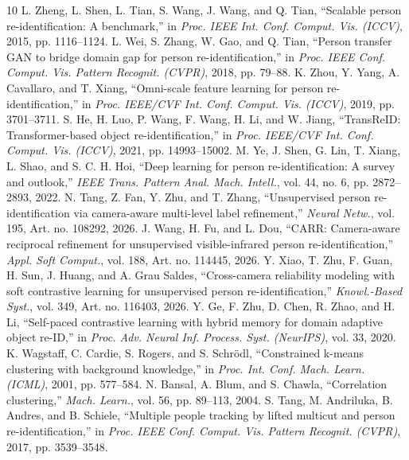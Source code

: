 \documentclass[journal]{IEEEtran}
\begin{document}
\begin{thebibliography}{10}
 L. Zheng, L. Shen, L. Tian, S. Wang, J. Wang, and Q. Tian, ``Scalable person re-identification: A benchmark,'' in \emph{Proc. IEEE Int. Conf. Comput. Vis. (ICCV)}, 2015, pp. 1116--1124.
 L. Wei, S. Zhang, W. Gao, and Q. Tian, ``Person transfer GAN to bridge domain gap for person re-identification,'' in \emph{Proc. IEEE Conf. Comput. Vis. Pattern Recognit. (CVPR)}, 2018, pp. 79--88.
 K. Zhou, Y. Yang, A. Cavallaro, and T. Xiang, ``Omni-scale feature learning for person re-identification,'' in \emph{Proc. IEEE/CVF Int. Conf. Comput. Vis. (ICCV)}, 2019, pp. 3701--3711.
 S. He, H. Luo, P. Wang, F. Wang, H. Li, and W. Jiang, ``TransReID: Transformer-based object re-identification,'' in \emph{Proc. IEEE/CVF Int. Conf. Comput. Vis. (ICCV)}, 2021, pp. 14993--15002.
 M. Ye, J. Shen, G. Lin, T. Xiang, L. Shao, and S. C. H. Hoi, ``Deep learning for person re-identification: A survey and outlook,'' \emph{IEEE Trans. Pattern Anal. Mach. Intell.}, vol. 44, no. 6, pp. 2872--2893, 2022.
 N. Tang, Z. Fan, Y. Zhu, and T. Zhang, ``Unsupervised person re-identification via camera-aware multi-level label refinement,'' \emph{Neural Netw.}, vol. 195, Art. no. 108292, 2026.
 J. Wang, H. Fu, and L. Dou, ``CARR: Camera-aware reciprocal refinement for unsupervised visible-infrared person re-identification,'' \emph{Appl. Soft Comput.}, vol. 188, Art. no. 114445, 2026.
 Y. Xiao, T. Zhu, F. Guan, H. Sun, J. Huang, and A. Grau Saldes, ``Cross-camera reliability modeling with soft contrastive learning for unsupervised person re-identification,'' \emph{Knowl.-Based Syst.}, vol. 349, Art. no. 116403, 2026.
 Y. Ge, F. Zhu, D. Chen, R. Zhao, and H. Li, ``Self-paced contrastive learning with hybrid memory for domain adaptive object re-ID,'' in \emph{Proc. Adv. Neural Inf. Process. Syst. (NeurIPS)}, vol. 33, 2020.
 K. Wagstaff, C. Cardie, S. Rogers, and S. Schr\"odl, ``Constrained k-means clustering with background knowledge,'' in \emph{Proc. Int. Conf. Mach. Learn. (ICML)}, 2001, pp. 577--584.
 N. Bansal, A. Blum, and S. Chawla, ``Correlation clustering,'' \emph{Mach. Learn.}, vol. 56, pp. 89--113, 2004.
 S. Tang, M. Andriluka, B. Andres, and B. Schiele, ``Multiple people tracking by lifted multicut and person re-identification,'' in \emph{Proc. IEEE Conf. Comput. Vis. Pattern Recognit. (CVPR)}, 2017, pp. 3539--3548.

\end{thebibliography}
\end{document}
